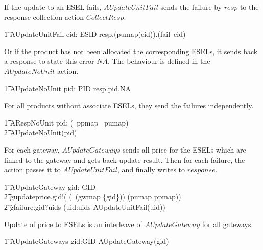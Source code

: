 If the update to an ESEL fails, $AUpdateUnitFail$ sends the failure by $resp$ to the response collection action $CollectResp$.
\begin{circusaction}
        \t1 AUpdateUnitFail \circdef  eid: ESID \circspot resp.(pumap(eid)).(fail~eid) \then \Skip \\ 
\end{circusaction}

Or if the product has not been allocated the corresponding ESELs, it sends back a response to state this error $NA$. The behaviour is defined in the $AUpdateNoUnit$ action. 
\begin{circusaction}
        \t1 AUpdateNoUnit \circdef  pid: PID \circspot resp.pid.NA \then \Skip \\ 
\end{circusaction}

For all products without associate ESELs, they send the failures independently. 
\begin{circusaction}
        \t1 ARespNoUnit \circdef \Interleave pid: (\dom~ppmap \setminus \ran~pumap) \linter \emptyset \rinter \circspot \\
        \t2 AUpdateNoUnit(pid) \\ 
\end{circusaction}

For each gateway, $AUpdateGateways$ sends all price for the ESELs which are linked to the gateway and gets back update result. Then for each failure, the action passes it to $AUpdateUnitFail$, and finally writes to $response$.
\begin{circusaction}
    \t1 AUpdateGateway \circdef  gid: GID \circspot \\
        \t2 gupdateprice.gid!( (\dom~(gwmap \rres \{gid\})) \dres (pumap \comp ppmap)) \then \\
        \t2 gfailure.gid?uids \then (\Interleave uid:uids \linter \emptyset \rinter \circspot AUpdateUnitFail(uid)) \\ 
\end{circusaction}

Update of price to ESELs is an interleave of $AUpdateGateway$ for all gateways.
\begin{circusaction}
    \t1 AUpdateGateways \circdef \Interleave gid:GID \linter \emptyset \rinter \circspot AUpdateGateway(gid)
\end{circusaction}

